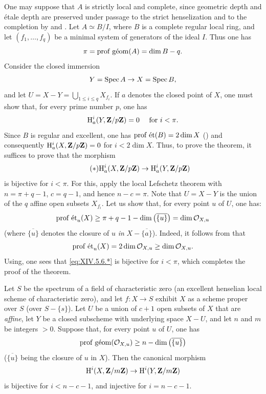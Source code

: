 One may suppose that $A$ is strictly local and complete, since geometric depth and \'{e}tale depth are preserved under passage to the strict henselization and to the completion by  and . Let $A\simeq B/I$, where $B$ is a complete regular local ring, and let $(f_{1},\dots, f_{q})$ be a minimal system of generators of the ideal $I$. Thus one has\pageoriginale
$$
\pi=\operatorname{prof\;g\acute{e}om}(A)=\dim B-q.
$$
Consider the closed immersion
$$Y=\operatorname{Spec} A\to X=\operatorname{Spec} B,
$$
and let\sisi{}{} $U=X-Y=\bigcup_{1\leq i\leq q}X_{f_{i}}$. If $a$ denotes the closed point of $X$, one must show that, for every prime number $p$, one has
$$
\mathrm H_{a}^{i}(Y, \mathbf Z/p\mathbf Z)=0\quad\textrm{ for }i<\pi.
$$
Since $B$ is regular and excellent, one has $\operatorname{prof\;\acute{e}t}(B)=2\dim X$ (\cf {}) and consequently $\mathrm H_{a}^{i}(X, \mathbf Z/p\mathbf Z)=0$ for $i<2\dim X$. Thus, to prove the theorem, it suffices to prove that the morphism
\begin{equation*} \label{eq:XIV.5.6.*} \tag{$*$}
\mathrm H_{a}^{i}(X, \mathbf Z/p\mathbf Z)\to\mathrm H_{a}^{i}(Y, \mathbf Z/p\mathbf Z)
\end{equation*}
is bijective for $i<\pi$. For this, apply the local Lefschetz theorem  with $n=\pi+q-1$, $c=q-1$, and hence $n-c=\pi$. Note that $U=X-Y$ is the union of the $q$ affine open subsets $X_{f_{i}}$. Let us show that, for every point $u$ of $U$, one has:
$$
\operatorname{prof\;\acute{e}t}_{u}(X)\geq\pi+q-1-\dim\big(\overline{\{ u\} }\big)=\dim\mathcal O_{X, u}$$
(where $\overline{\{ u\} }$ denotes the closure of $u$ \emph{in} $X-\overline{\{ a\} }$). Indeed, it follows from  that
$$
\operatorname{prof\;\acute{e}t}_{u}(X)=2\dim\mathcal O_{X, u}\geq\dim\mathcal O_{X, u}.
$$
Using\pageoriginaled {}, one sees that \eqref{eq:XIV.5.6.*} is bijective for $i<\pi$, which completes the proof of the theorem.

\begin{corollaire} \label{XIV.5.7} Let $S$ be the spectrum of a field of characteristic zero (\resp an excellent henselian local scheme of characteristic zero), and let $f\colon X\to S$ exhibit $X$ as a scheme proper over $S$ (\resp over $S-\{ s\}$). Let $U$ be a union of $c+1$ open subsets of $X$ that are \emph{affine}, let $Y$ be a closed subscheme with underlying space $X-U$, and let $n$ and $m$ be integers $>0$. Suppose that, for every point $u$ of $U$, one has
$$
\operatorname{prof\;g\acute{e}om}(\mathcal O_{X, u})\geq n-\dim\big(\overline{\{ u\} }\big)$$
($\overline{\{ u\} }$ being the closure of $u$ in $X$). Then the canonical morphism
$$
\mathrm H^{i}(X, \mathbf Z/m\mathbf Z)\to\mathrm H^{i}(Y, \mathbf Z/m\mathbf Z)$$
is bijective for $i<n-c-1$, and injective for $i=n-c-1$.
\end{corollaire}


